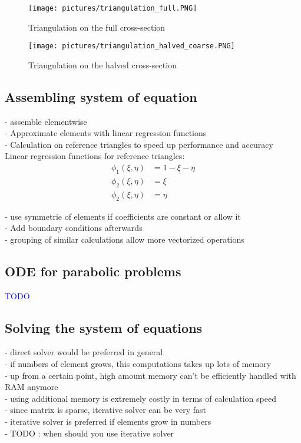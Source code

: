 \documentclass[parskip=half, titlepage=yes, 12pt, BCOR=12mm, DIV=calc]{scrartcl}
\begin{document}
\begin{figure}[H]
    \centering
    \texttt{[image: pictures/triangulation\_full.PNG]}
    \caption{Triangulation on the full cross-section}
    \label{fig:triangulation_full}
\end{figure}

\begin{figure}[H]
    \centering
    \texttt{[image: pictures/triangulation\_halved\_coarse.PNG]}
    \caption{Triangulation on the halved cross-section}
    \label{fig:triangulation_halved}
\end{figure}
\subsection{Assembling system of equation}

- assemble elementwise \\
- Approximate elements with linear regression functions\\
- Calculation on reference triangles to speed up performance and accuracy \\

Linear regression functions for reference triangles:
\begin{align}
    \phi_1(\xi, \eta) &= 1 - \xi - \eta \\
    \phi_2(\xi, \eta) &= \xi \\
    \phi_2(\xi, \eta) &= \eta 
\end{align}

- use symmetrie of elements if coefficients are constant or allow it \\
- Add boundary conditions afterwards \\
- grouping of similar calculations allow more vectorized operations \\ 

\subsection{ODE for parabolic problems}

\textcolor{blue}{TODO}

\subsection{Solving the system of equations}
- direct solver would be preferred in general \\
- if numbers of element grows, this computations takes up lots of memory \\
- up from a certain point, high amount memory can't be efficiently handled with RAM anymore \\
- using additional memory is extremely costly in terms of calculation speed \\
- since matrix is sparse, iterative solver can be very fast \\
- iterative solver is preferred if elements grow in numbers \\
- TODO : when should you use iterative solver \\
\end{document}
